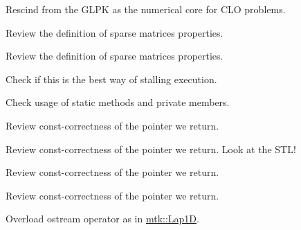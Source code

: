 \begin{DoxyRefList}
\item[\label{todo__todo000002}%
\hypertarget{todo__todo000002}{}%
Class \hyperlink{classmtk_1_1GLPKAdapter}{mtk\+:\+:G\+L\+P\+K\+Adapter} ]Rescind from the G\+L\+P\+K as the numerical core for C\+L\+O problems.  
\item[\label{todo__todo000024}%
\hypertarget{todo__todo000024}{}%
Member \hyperlink{classmtk_1_1Matrix_af4bba5c43d1f09f5059a04298ba24568}{mtk\+:\+:Matrix\+:\+:Increase\+Num\+Null} () noexcept]Review the definition of sparse matrices properties.  
\item[\label{todo__todo000023}%
\hypertarget{todo__todo000023}{}%
Member \hyperlink{classmtk_1_1Matrix_ace7cb5c31d0de66b8f9c63cd542c9e63}{mtk\+:\+:Matrix\+:\+:Increase\+Num\+Zero} () noexcept]Review the definition of sparse matrices properties.  
\item[\label{todo__todo000025}%
\hypertarget{todo__todo000025}{}%
Member \hyperlink{classmtk_1_1Tools_a332324c6f25e66be9dff48c5987a3b9f}{mtk\+:\+:Tools\+:\+:Prevent} (const bool complement, const char $\ast$const fname, int lineno, const char $\ast$const fxname) noexcept]Check if this is the best way of stalling execution.  
\item[\label{todo__todo000026}%
\hypertarget{todo__todo000026}{}%
Member \hyperlink{classmtk_1_1Tools_a04a60458594336ee1badff79b8a9a77f}{mtk\+:\+:Tools\+:\+:test\+\_\+number\+\_\+} ]Check usage of static methods and private members.  
\item[\label{todo__todo000007}%
\hypertarget{todo__todo000007}{}%
Member \hyperlink{classmtk_1_1UniStgGrid1D_aa1999580cb98c19950e951510871cc90}{mtk\+:\+:Uni\+Stg\+Grid1\+D\+:\+:discrete\+\_\+domain\+\_\+x} () const ]Review const-\/correctness of the pointer we return.  
\item[\label{todo__todo000008}%
\hypertarget{todo__todo000008}{}%
Member \hyperlink{classmtk_1_1UniStgGrid1D_acf28d702f6e702599986afcb253bbfc1}{mtk\+:\+:Uni\+Stg\+Grid1\+D\+:\+:discrete\+\_\+field\+\_\+u} ()]Review const-\/correctness of the pointer we return. Look at the S\+T\+L!  
\item[\label{todo__todo000010}%
\hypertarget{todo__todo000010}{}%
Member \hyperlink{classmtk_1_1UniStgGrid2D_ab2f70cf5cd0a2d5486992d9f2f8baa4a}{mtk\+:\+:Uni\+Stg\+Grid2\+D\+:\+:discrete\+\_\+domain\+\_\+x} () const ]Review const-\/correctness of the pointer we return.  
\item[\label{todo__todo000011}%
\hypertarget{todo__todo000011}{}%
Member \hyperlink{classmtk_1_1UniStgGrid2D_ac33a58d65105550dcf6f6b92b48b5105}{mtk\+:\+:Uni\+Stg\+Grid2\+D\+:\+:discrete\+\_\+domain\+\_\+y} () const ]Review const-\/correctness of the pointer we return.  
\item[\label{todo__todo000018}%
\hypertarget{todo__todo000018}{}%
File \hyperlink{mtk__div__1d_8cc}{mtk\+\_\+div\+\_\+1d.cc} ]Overload ostream operator as in \hyperlink{classmtk_1_1Lap1D}{mtk\+::\+Lap1\+D}.


\end{DoxyRefList}
